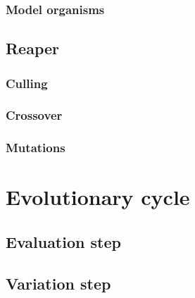 \documentclass[main]{subfiles}
\begin{document}
\lipsum[11]

\subsubsection{Model organisms}

\lipsum[12]

\subsection{Reaper}
\label{subsection:Reaper}

\lipsum[13]

\subsubsection{Culling}
\label{subsubsection:Culling}

\lipsum[14]

\subsubsection{Crossover}

\lipsum[14]

\subsubsection{Mutations}

\lipsum[15]

\section{Evolutionary cycle}

\lipsum[16]

\subsection{Evaluation step}

\lipsum[17]

\subsection{Variation step}

\lipsum[18]

\end{document}
